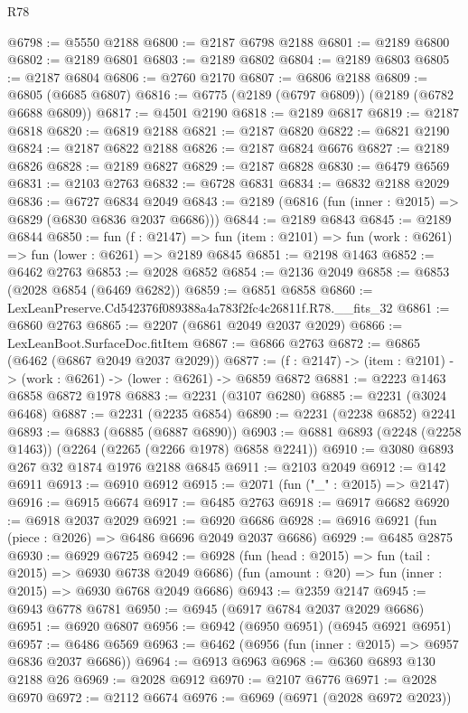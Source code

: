 \begin{lexlean}{R78}
\begin{coremodule}
@6798 := @5550 @2188
@6800 := @2187 @6798 @2188
@6801 := @2189 @6800
@6802 := @2189 @6801
@6803 := @2189 @6802
@6804 := @2189 @6803
@6805 := @2187 @6804
@6806 := @2760 @2170
@6807 := @6806 @2188
@6809 := @6805 (@6685 @6807)
@6816 := @6775 (@2189 (@6797 @6809)) (@2189 (@6782 @6688 @6809))
@6817 := @4501 @2190
@6818 := @2189 @6817
@6819 := @2187 @6818
@6820 := @6819 @2188
@6821 := @2187 @6820
@6822 := @6821 @2190
@6824 := @2187 @6822 @2188
@6826 := @2187 @6824 @6676
@6827 := @2189 @6826
@6828 := @2189 @6827
@6829 := @2187 @6828
@6830 := @6479 @6569
@6831 := @2103 @2763
@6832 := @6728 @6831
@6834 := @6832 @2188 @2029
@6836 := @6727 @6834 @2049
@6843 := @2189 (@6816 (fun (inner : @2015) => @6829 (@6830 @6836 @2037 @6686)))
@6844 := @2189 @6843
@6845 := @2189 @6844
@6850 := fun (f : @2147) =>
  fun (item : @2101) => fun (work : @6261) => fun (lower : @6261) => @2189 @6845
@6851 := @2198 @1463
@6852 := @6462 @2763
@6853 := @2028 @6852
@6854 := @2136 @2049
@6858 := @6853 (@2028 @6854 (@6469 @6282))
@6859 := @6851 @6858
@6860 := LexLeanPreserve.Cd542376f089388a4a783f2fc4c26811f.R78.__fits_32
@6861 := @6860 @2763
@6865 := @2207 (@6861 @2049 @2037 @2029)
@6866 := LexLeanBoot.SurfaceDoc.fitItem
@6867 := @6866 @2763
@6872 := @6865 (@6462 (@6867 @2049 @2037 @2029))
@6877 := (f : @2147) -> (item : @2101) -> (work : @6261) -> (lower : @6261) -> @6859 @6872
@6881 := @2223 @1463 @6858 @6872 @1978
@6883 := @2231 (@3107 @6280)
@6885 := @2231 (@3024 @6468)
@6887 := @2231 (@2235 @6854)
@6890 := @2231 (@2238 @6852) @2241
@6893 := @6883 (@6885 (@6887 @6890))
@6903 := @6881 @6893 (@2248 (@2258 @1463)) (@2264 (@2265 (@2266 @1978) @6858 @2241))
@6910 := @3080 @6893 @267 @32 @1874 @1976 @2188 @6845
@6911 := @2103 @2049
@6912 := @142 @6911
@6913 := @6910 @6912
@6915 := @2071 (fun ("_" : @2015) => @2147)
@6916 := @6915 @6674
@6917 := @6485 @2763
@6918 := @6917 @6682
@6920 := @6918 @2037 @2029
@6921 := @6920 @6686
@6928 := @6916 @6921 (fun (piece : @2026) => @6486 @6696 @2049 @2037 @6686)
@6929 := @6485 @2875
@6930 := @6929 @6725
@6942 := @6928
    (fun (head : @2015) => fun (tail : @2015) => @6930 @6738 @2049 @6686)
    (fun (amount : @20) => fun (inner : @2015) => @6930 @6768 @2049 @6686)
@6943 := @2359 @2147
@6945 := @6943 @6778 @6781
@6950 := @6945 (@6917 @6784 @2037 @2029 @6686)
@6951 := @6920 @6807
@6956 := @6942 (@6950 @6951) (@6945 @6921 @6951)
@6957 := @6486 @6569
@6963 := @6462 (@6956 (fun (inner : @2015) => @6957 @6836 @2037 @6686))
@6964 := @6913 @6963
@6968 := @6360 @6893 @130 @2188 @26
@6969 := @2028 @6912
@6970 := @2107 @6776
@6971 := @2028 @6970
@6972 := @2112 @6674
@6976 := @6969 (@6971 (@2028 @6972 @2023))

\end{coremodule}
\end{lexlean}

